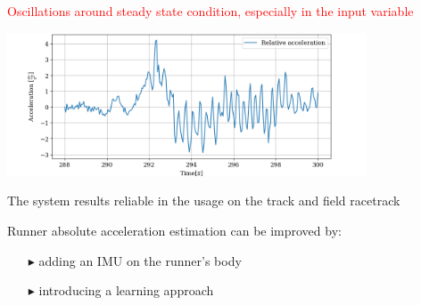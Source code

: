 \documentclass[9pt, aspectratio=169]{beamer}
\begin{document}
\begin{frame}
\begin{columns}
\begin{column}{0.6\textwidth}
\vspace{-0.4cm}
\begin{block}{}
\centering
\textcolor{red}{Oscillations around steady state condition, especially in the input variable}
\end{block}
\vspace{0.2cm}
	\begin{center}
  		\includegraphics[width=0.8\textwidth]{Hardware_test/Acceleration} 
	\end{center}

The system results reliable in the usage on the track and field racetrack

\vspace{0.1cm}
\begin{block}{}
Runner absolute acceleration estimation can be improved by:
\begin{itemize}
	\footnotesize
	\item[$\blacktriangleright$] adding an IMU on the runner's body 
	\item[$\blacktriangleright$] introducing a learning approach
\end{itemize}
\end{block}

\end{column}
\end{columns}

\end{frame}
\end{document}
